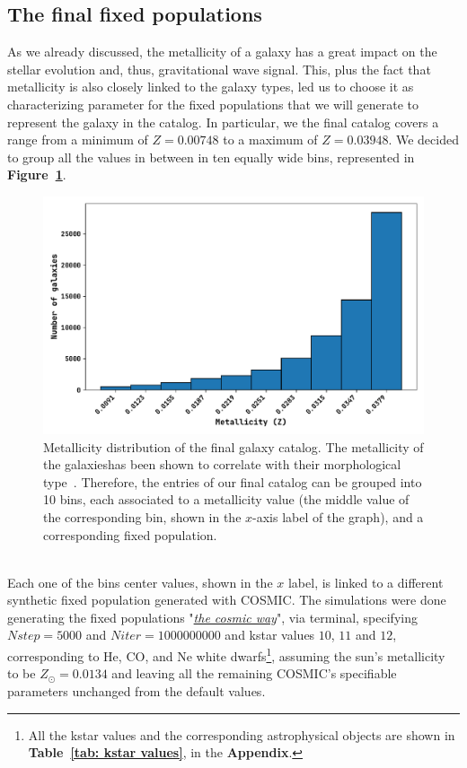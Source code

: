 \subsection{The final fixed populations}
As we already discussed, the metallicity of a galaxy has a great impact on the stellar evolution and, thus, gravitational wave signal.
This, plus the fact that metallicity is also closely linked to the galaxy types, led us to choose it as characterizing parameter for the fixed populations that we will generate to represent the galaxy in the catalog.
In particular, we the final catalog covers a range from a minimum of $ Z= 0.00748$ to a maximum of $Z= 0.03948$.
We decided to group all the values in between in ten equally wide bins, represented in \textbf{Figure~\ref{fig: Z distribution of final catalog}}.
\begin{figure}[h!]
    \begin{center}
        \includegraphics[width=\textwidth]{images/z_distro_gwgc_completed_ZOA.pdf}
    \end{center}
    \caption{Metallicity distribution of the final galaxy catalog. 
    The metallicity of the galaxieshas been shown to correlate with their morphological type~\cite{Faber&Gallagher}.
    Therefore, the entries of our final catalog can be grouped into 10 bins, each associated to a metallicity value (the middle value of the corresponding bin, shown in the $x$-axis label of the graph), and a corresponding fixed population.
    }\label{fig: Z distribution of final catalog}
\end{figure}\\
Each one of the bins center values, shown in the $x$ label, is linked to a different synthetic fixed population generated with COSMIC.
The simulations were done generating the fixed populations "\textit{\href{https://cosmic-popsynth.github.io/docs/stable/pages/fixedpop.html}{the cosmic way}}", via terminal, specifying $Nstep = 5000$ and $Niter=1000000000$ and kstar values $10$, $11$ and $12$, corresponding to He, CO, and Ne white dwarfs\footnote{All the kstar values and the corresponding astrophysical objects are shown in \textbf{Table~\ref{tab: kstar values}}, in the \textbf{Appendix}.}, assuming the sun's metallicity to be $Z_\odot = 0.0134$ and leaving all the remaining COSMIC's specifiable parameters unchanged from the default values.


